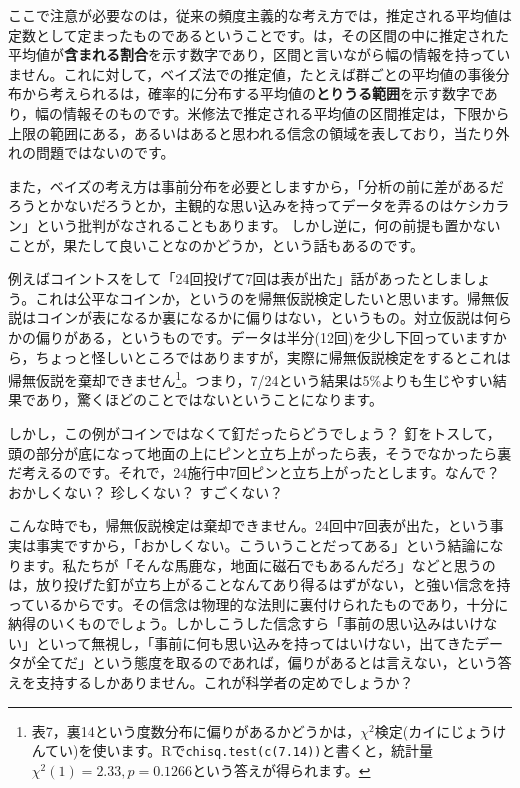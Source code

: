 \documentclass{ltjbook}
\begin{document}
ここで注意が必要なのは，従来の頻度主義的な考え方では，推定される平均値は定数として定まったものであるということです。は，その区間の中に推定された平均値が\textbf{含まれる割合}を示す数字であり，区間と言いながら幅の情報を持っていません。これに対して，ベイズ法での推定値，たとえば群ごとの平均値の事後分布から考えられるは，確率的に分布する平均値の\textbf{とりうる範囲}を示す数字であり，幅の情報そのものです。米修法で推定される平均値の区間推定は，下限から上限の範囲にある，あるいはあると思われる信念の領域を表しており，当たり外れの問題ではないのです。

また，ベイズの考え方は事前分布を必要としますから，「分析の前に差があるだろうとかないだろうとか，主観的な思い込みを持ってデータを弄るのはケシカラン」という批判がなされることもあります。
しかし逆に，何の前提も置かないことが，果たして良いことなのかどうか，という話もあるのです\citep{Maeda2017}。

例えばコイントスをして「24回投げて7回は表が出た」話があったとしましょう。これは公平なコインか，というのを帰無仮説検定したいと思います。帰無仮説はコインが表になるか裏になるかに偏りはない，というもの。対立仮説は何らかの偏りがある，というものです。データは半分(12回)を少し下回っていますから，ちょっと怪しいところではありますが，実際に帰無仮説検定をするとこれは帰無仮説を棄却できません\footnote{表7，裏14という度数分布に偏りがあるかどうかは，$\chi^2$検定(カイにじょうけんてい)を使います。Rで\texttt{chisq.test(c(7.14))}と書くと，統計量$\chi^2(1)=2.33,p=0.1266$という答えが得られます。}。つまり，7/24という結果は5\%よりも生じやすい結果であり，驚くほどのことではないということになります。

しかし，この例がコインではなくて釘だったらどうでしょう？ 釘をトスして，頭の部分が底になって地面の上にピンと立ち上がったら表，そうでなかったら裏だ考えるのです。それで，24施行中7回ピンと立ち上がったとします。なんで？ おかしくない？ 珍しくない？ すごくない？ 

こんな時でも，帰無仮説検定は棄却できません。24回中7回表が出た，という事実は事実ですから，「おかしくない。こういうことだってある」という結論になります。私たちが「そんな馬鹿な，地面に磁石でもあるんだろ」などと思うのは，放り投げた釘が立ち上がることなんてあり得るはずがない，と強い信念を持っているからです。その信念は物理的な法則に裏付けられたものであり，十分に納得のいくものでしょう。しかしこうした信念すら「事前の思い込みはいけない」といって無視し，「事前に何も思い込みを持ってはいけない，出てきたデータが全てだ」という態度を取るのであれば，偏りがあるとは言えない，という答えを支持するしかありません。これが科学者の定めでしょうか？ 
\end{document}
